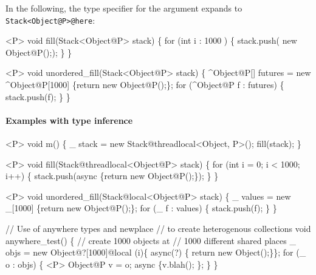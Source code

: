 In the following, the type specifier for the argument expands to
{\tt Stack<Object@P>@here}:

\begin{x10}
 <P> void fill(Stack<Object@P> stack) \{
    for (int i : 1000 ) \{
        stack.push( new Object@P(););
    \}
 \}

 <P> void unordered\_fill(Stack<Object@P> stack) \{
    ^Object@P[] futures = new ^Object@P[1000] 
          \{return new Object@P();\}; 
    for (^Object@P f : futures) \{
        stack.push(f);
    \}
 \}
\end{x10}

\paragraph{Examples with type inference}
\begin{x10}
 <P> void m() \{
    \_ stack = new Stack@threadlocal<Object, P>();
    fill(stack);
\}

 <P> void fill(Stack@threadlocal<Object@P> stack) \{
    for (int i = 0; i < 1000; i++) \{
        stack.push(async \{return new Object@P();\});
    \}
\}

<P> void unordered\_fill(Stack@local<Object@P> stack) \{
    \_ values = new \_[1000] \{return new Object@P();\};
    for (\_ f : values) \{
        stack.push(f);
    \}
\}

 // Use of anywhere types and newplace 
 // to create heterogenous collections
 void anywhere\_test() \{
    // create 1000 objects at 
    // 1000 different shared places
   \_ objs = new Object@?[1000]@local 
          (i)\{ async(?) \{ return new Object();\}\};
    for (\_ o : objs) \{
        <P> Object@P v = o;
        async \{v.blah(); \};
    \}
 \}
\end{x10}
